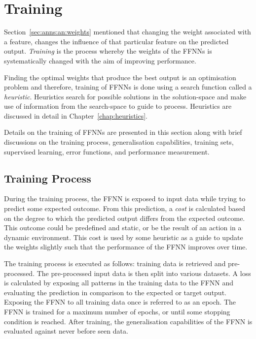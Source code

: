 \section{Training}
\label{sec:anns:training}

Section~\ref{sec:anns:an:weights} mentioned that changing the weight associated
with a feature, changes the influence of that particular feature on the
predicted output. \textit{Training} is the process whereby the weights of the
\acp{FFNN} is systematically changed with the aim of improving performance.

Finding the optimal weights that produce the best output is an optimisation
problem and therefore, training of \acp{FFNN} is done using a search function
called a \textit{heuristic}. Heuristics search
for possible solutions in the solution-space and make use of information from
the search-space to guide to process. Heuristics are discussed in detail in
Chapter~\ref{chap:heuristics}.

Details on the training of \acp{FFNN} are presented in this section along with
brief discussions on the training process, generalisation capabilities, training
sets, supervised learning, error functions, and
performance measurement.


\subsection{Training Process}
\label{sec:anns:training:process}

During the training process, the \ac{FFNN} is exposed to input data while
trying to predict some expected outcome. From this prediction, a \textit{cost}
is calculated based on the degree to which the predicted output differs from the
expected outcome. This outcome could be predefined and static, or be the result
of an action in a dynamic environment. This cost is used by some
heuristic as a guide to update the weights slightly such that
the performance of the \ac{FFNN} improves over time.

The training process is executed as follows: training data is retrieved and
pre-processed. The pre-processed input data is then split into various datasets.
A loss is calculated by exposing all patterns in the training data to the
\ac{FFNN} and evaluating the  prediction in comparison to the expected or target
output. Exposing the \ac{FFNN} to all training data once is referred to as an
epoch. The \ac{FFNN} is trained for a maximum number of epochs, or until some
stopping condition is reached. After training, the generalisation capabilities
of the \ac{FFNN} is evaluated against never before seen data.

